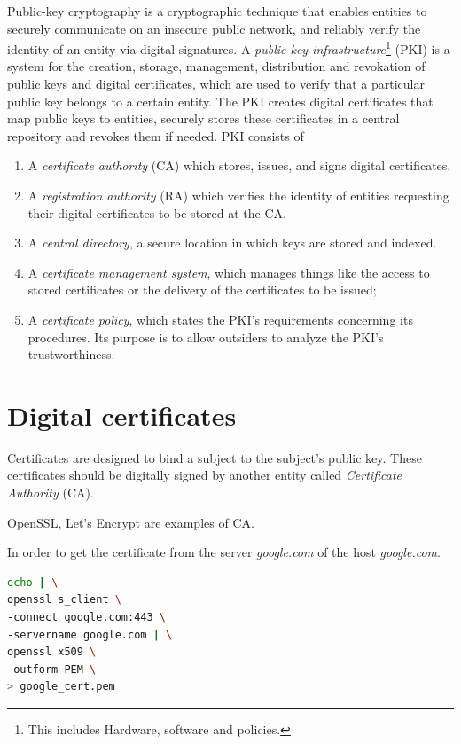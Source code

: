 \documentclass[a4paper, 12pt]{book} %
\begin{document}
Public-key cryptography is a cryptographic technique that enables entities to securely communicate on an insecure public network, and reliably verify the identity of an entity via digital signatures. A \emph{public key infrastructure}\footnote{This includes Hardware, software and policies.} (PKI) is a system for the creation, storage, management, distribution and revokation of public keys and digital certificates, which are used to verify that a particular public key belongs to a certain entity. The PKI creates digital certificates that map public keys to entities, securely stores these certificates in a central repository and revokes them if needed. PKI consists of
\begin{enumerate}
    \item A \emph{certificate authority} (CA) which stores, issues, and signs digital certificates.
    \item A \emph{registration authority} (RA) which verifies the identity of entities requesting their digital certificates to be stored at the CA.
    \item A \emph{central directory}, a secure location in which keys are stored and indexed.
    \item A \emph{certificate management system}, which manages things like the access to stored certificates or the delivery of the certificates to be issued;
    \item A \emph{certificate policy}, which states the PKI's requirements concerning its procedures. Its purpose is to allow outsiders to analyze the PKI's trustworthiness.
\end{enumerate}


\section{Digital certificates}

Certificates are designed to bind a subject to the subject's public key. These certificates should be digitally signed by another entity called \emph{Certificate Authority} (CA).

\begin{example}
    OpenSSL, Let's Encrypt are examples of CA.
\end{example}


In order to get the certificate from the server \emph{google.com} of the host \emph{google.com}.
\begin{lstlisting}[style=darkbash, language=bash]
echo | \
openssl s_client \
-connect google.com:443 \
-servername google.com | \
openssl x509 \
-outform PEM \
> google_cert.pem
\end{lstlisting}
\end{document}
